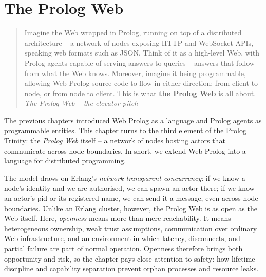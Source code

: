 
\chapter{The Prolog Web}\label{sec:the-prolog-web}

\begin{quotation}
\noindent Imagine the Web wrapped in Prolog, running on top of a distributed architecture -- a network of nodes exposing HTTP and WebSocket APIs, speaking web formats such as JSON. Think of it as a high-level Web, with Prolog agents capable of serving answers to queries -- answers that follow from what the Web knows. Moreover, imagine it being programmable, allowing Web Prolog source code to flow in either direction: from client to node, or from node to client. This is what \textbf{the Prolog Web} is all about.
\vspace{-0.2cm}
\flushright\textit{The Prolog Web -- the elevator pitch}
\end{quotation}
\vspace{0.5cm}

\noindent The previous chapters introduced Web Prolog as a language
and Prolog agents as programmable entities. This chapter turns to
the third element of the Prolog Trinity: the \emph{Prolog Web}
itself -- a network of nodes hosting actors that communicate across
node boundaries. In short, we extend Web Prolog into a language for
distributed programming.

The model draws on Erlang's \textit{network-transparent concurrency}: if we
know a node's identity and we are authorised, we can spawn an actor
there; if we know an actor's pid or its registered name, we can send it a message, even across node boundaries. Unlike an Erlang cluster, however, the
Prolog Web is as open as the Web itself. Here, \emph{openness} means more than
mere reachability. It means heterogeneous ownership, weak trust assumptions,
communication over ordinary Web infrastructure, and an environment in which
latency, disconnects, and partial failure are part of normal operation.
Openness therefore brings both opportunity and risk, so the chapter pays close
attention to safety: how lifetime discipline and capability separation prevent
orphan processes and resource leaks.


